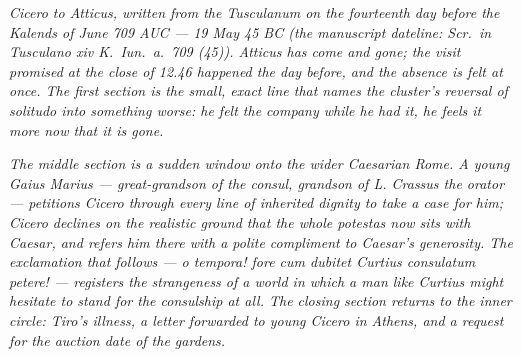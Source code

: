 
\textit{Cicero to Atticus, written from the Tusculanum
on the fourteenth day before the Kalends of June 709
AUC --- 19 May 45 BC (the manuscript dateline:
\textit{Scr.\ in Tusculano xiv K.\ Iun.\ a.\ 709
(45)}). Atticus has come and gone; the visit promised
at the close of 12.46 happened the day before, and
the absence is felt at once. The first section is the
small, exact line that names the cluster's reversal
of \textit{solitudo} into something worse: he felt
the company while he had it, he feels it more now
that it is gone.}

\textit{The middle section is a sudden window onto
the wider Caesarian Rome. A young Gaius Marius ---
great-grandson of the consul, grandson of L. Crassus
the orator --- petitions Cicero through every line of
inherited dignity to take a case for him; Cicero
declines on the realistic ground that the whole
\textit{potestas} now sits with Caesar, and refers
him there with a polite compliment to Caesar's
generosity. The exclamation that follows ---
\textit{o tempora! fore cum dubitet Curtius
consulatum petere!} --- registers the strangeness of
a world in which a man like Curtius might hesitate to
stand for the consulship at all. The closing section
returns to the inner circle: Tiro's illness, a letter
forwarded to young Cicero in Athens, and a request
for the auction date of the gardens.}
